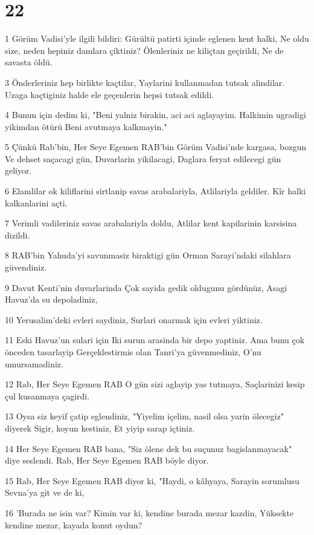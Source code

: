 \chapter{22}

\par 1 Görüm Vadisi'yle ilgili bildiri: Gürültü patirti içinde eglenen kent halki, Ne oldu size, neden hepiniz damlara çiktiniz? Ölenleriniz ne kiliçtan geçirildi, Ne de savasta öldü.
\par 3 Önderleriniz hep birlikte kaçtilar, Yaylarini kullanmadan tutsak alindilar. Uzaga kaçtiginiz halde ele geçenlerin hepsi tutsak edildi.
\par 4 Bunun için dedim ki, "Beni yalniz birakin, aci aci aglayayim. Halkimin ugradigi yikimdan ötürü Beni avutmaya kalkmayin."
\par 5 Çünkü Rab'bin, Her Seye Egemen RAB'bin Görüm Vadisi'nde kargasa, bozgun Ve dehset saçacagi gün, Duvarlarin yikilacagi, Daglara feryat edilecegi gün geliyor.
\par 6 Elamlilar ok kiliflarini sirtlanip savas arabalariyla, Atlilariyla geldiler. Kîr halki kalkanlarini açti.
\par 7 Verimli vadileriniz savas arabalariyla doldu, Atlilar kent kapilarinin karsisina dizildi.
\par 8 RAB'bin Yahuda'yi savunmasiz biraktigi gün Orman Sarayi'ndaki silahlara güvendiniz.
\par 9 Davut Kenti'nin duvarlarinda Çok sayida gedik oldugunu gördünüz, Asagi Havuz'da su depoladiniz,
\par 10 Yerusalim'deki evleri saydiniz, Surlari onarmak için evleri yiktiniz.
\par 11 Eski Havuz'un sulari için Iki surun arasinda bir depo yaptiniz. Ama bunu çok önceden tasarlayip Gerçeklestirmis olan Tanri'ya güvenmediniz, O'nu umursamadiniz.
\par 12 Rab, Her Seye Egemen RAB O gün sizi aglayip yas tutmaya, Saçlarinizi kesip çul kusanmaya çagirdi.
\par 13 Oysa siz keyif çatip eglendiniz, "Yiyelim içelim, nasil olsa yarin ölecegiz" diyerek Sigir, koyun kestiniz, Et yiyip sarap içtiniz.
\par 14 Her Seye Egemen RAB bana, "Siz ölene dek bu suçunuz bagislanmayacak" diye seslendi. Rab, Her Seye Egemen RAB böyle diyor.
\par 15 Rab, Her Seye Egemen RAB diyor ki, "Haydi, o kâhyaya, Sarayin sorumlusu Sevna'ya git ve de ki,
\par 16 'Burada ne isin var? Kimin var ki, kendine burada mezar kazdin, Yüksekte kendine mezar, kayada konut oydun?
